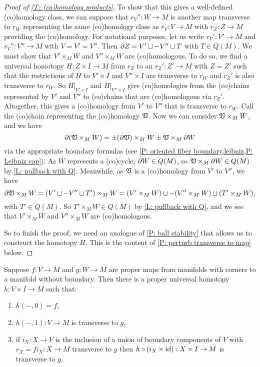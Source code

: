 \begin{proof}[Proof of \cref{T: (co)homology products}]
	To show that this gives a well-defined (co)homology class, we can suppose that $r_V'' \colon W \to M$ is another map transverse to $r_W$ representing the same (co)homology class as $r_V \colon V \to M$ with $r_Z:Z \to M$ providing the (co)homology.
	For notational purposes, let us write $r_V' \colon V' \to M$ and $r_V'' \colon V'' \to M$ with $V = V' = V''$.
	Then $\partial Z = V' \sqcup -V'' \sqcup T$ with $T \in Q(M)$.
	We must show that $V' \times_M W$ and $V'' \times_M W$ are (co)homologous.
	To do so, we find a universal homotopy $H \colon Z \times I \to M$ from $r_Z$ to an $r_Z':Z' \to M$ with $Z = Z'$ such that the restrictions of $H$ to $V' \times I$ and $V'' \times I$ are transverse to $r_W$ and $r_Z'$ is also transverse to $r_W$.
	So $H|_{V' \times I}$ and $H|_{V'' \times I}$ give (co)homologies from the (co)chains represented by $V'$ and $V''$ to (co)chains that are (co)homologous via $r_Z'$.
	Altogether, this gives a (co)homology from $V'$ to $V''$ that is transverse to $r_W$.
	Call the (co)chain representing the (co)homology $\mathfrak V$.
	Now we can consider $\mathfrak V \times_M W$, and we have $$\partial (\mathfrak V \times_M W) = \pm (\partial \mathfrak V) \times_M W\pm \mathfrak V \times_M \partial W$$ via the appropriate boundary formulas (see \cref{P: oriented fiber boundary,leibniz,P: Leibniz cap}).
	As $W$ represents a (co)cycle, $\partial W \in Q(M)$, so $\mathfrak V \times_M \partial W \in Q(M)$ by \cref{L: pullback with Q}.
	Meanwhile, as $\mathfrak V$ is a (co)homology from $V'$ to $V''$, we have $$\partial \mathfrak V \times_M W = (V' \sqcup -V'' \sqcup T') \times_M W = (V' \times_M W) \sqcup -(V'' \times_M W) \sqcup (T' \times_M W),$$
	with $T' \in Q(M)$.
	So $T' \times_M W \in Q(M)$ by \cref{L: pullback with Q}, and we see that $V' \times_M W$ and $V'' \times_M W$ are (co)homologous.

	So to finish the proof, we need an analogue of \cref{P: ball stability} that allows us to construct the homotopy $H$.
	This is the content of \cref{P: perturb transverse to map} below.
\end{proof}

\begin{proposition}\label{P: perturb transverse to map}
	Suppose $f \colon V \to M$ and $g \colon W \to M$ are proper maps from manifolds with corners to a manifold without boundary.
	Then there is a proper universal homotopy $h \colon V \times I \to M$ such that:
	\begin{enumerate}
		\item $h(-,0) = f$,
		\item $h(-,1) \colon V \to M$ is transverse to $g$,
		\item if $i_{X}:X \to V$ is the inclusion of a union of boundary components of $V$ with $r_X = fi_X:X \to M$ transverse to $g$ then $h \circ (i_{X} \times \mathrm{id}):X \times I \to M$ is transverse to $g$.
	\end{enumerate}
\end{proposition}

